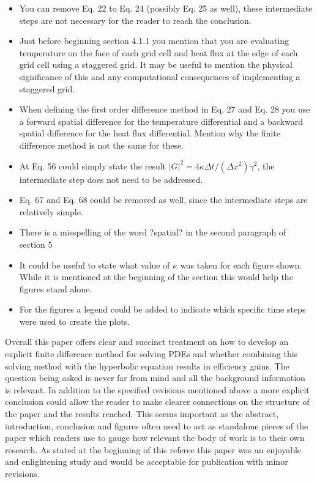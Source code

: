\documentclass[10pt,letterpaper]{article}
\begin{document}
\begin{itemize}
			\item You can remove Eq. 22 to Eq. 24 (possibly Eq. 25 as well), these intermediate steps are not necessary for the reader to reach the conclusion.
			\item Just before beginning section 4.1.1 you mention that you are evaluating temperature on the face of each grid cell and heat flux at the edge of each grid cell using a staggered grid. It may be useful to mention the physical significance of this and any computational consequences of implementing a staggered grid.
			\item When defining the first order difference method in Eq. 27 and Eq. 28 you use a forward spatial difference for the temperature differential and a backward spatial difference for the heat flux differential. Mention why the finite difference method is not the same for these.
			\item At Eq. 56 could simply state the result $|G|^2=4 \kappa \Delta t/(\Delta x^2 ) \gamma^2$, the intermediate step does not need to be addressed.
			\item Eq. 67 and Eq. 68 could be removed as well, since the intermediate steps are relatively simple.
			\item There is a misspelling of the word ?spatial? in the second paragraph of section 5
			\item It could be useful to state what value of $\kappa$ was taken for each figure shown. While it is mentioned at the beginning of the section this would help the figures stand alone.
			\item For the figures a legend could be added to indicate which specific time steps were used to create the plots.
		\end{itemize}
		
		Overall this paper offers clear and succinct treatment on how to develop an explicit finite difference method for solving PDEs and whether combining this solving method with the hyperbolic equation results in efficiency gains. The question being asked is never far from mind and all the background information is relevant. In addition to the specified revisions mentioned above a more explicit conclusion could allow the reader to make clearer connections on the structure of the paper and the results reached. This seems important as the abstract, introduction, conclusion and figures often need to act as standalone pieces of the paper which readers use to gauge how relevant the body of work is to their own research. As stated at the beginning of this referee this paper was an enjoyable and enlightening study and would be acceptable for publication with minor revisions.
	
\end{document}
